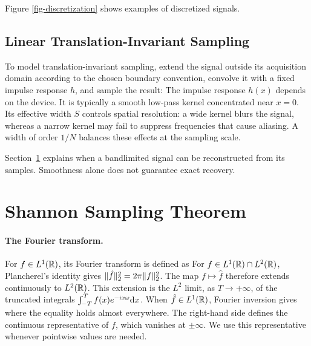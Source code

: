 Figure \ref{fig-discretization} shows examples of discretized signals.

\subsection{Linear Translation-Invariant Sampling}

To model translation-invariant sampling, extend the signal outside its acquisition domain according to the chosen boundary convention, convolve it with a fixed impulse response $h$, and sample the result:
The impulse response $h(x)$ depends on the device. It is typically a smooth low-pass kernel concentrated near $x=0$. Its effective width $S$ controls spatial resolution: a wide kernel blurs the signal, whereas a narrow kernel may fail to suppress frequencies that cause aliasing. A width of order $1/N$ balances these effects at the sampling scale.

Section~\ref{subsec-sampling} explains when a bandlimited signal can be reconstructed from its samples. Smoothness alone does not guarantee exact recovery.


\section{Shannon Sampling Theorem}
\label{subsec-sampling}

\paragraph{The Fourier transform.}

For $f \in L^1(\mathbb{R})$, its Fourier transform is defined as
For $f\in L^1(\mathbb{R})\cap L^2(\mathbb{R})$, Plancherel's identity gives $\lVert\hat f\rVert_2^2 = 2\pi\lVert f\rVert_2^2$. The map $f \mapsto \hat f$ therefore extends continuously to $L^2(\mathbb{R})$. This extension is the $L^2$ limit, as $T \rightarrow +\infty$, of the truncated integrals $\int_{-T}^T f(x) e^{-\mathrm{i} x \omega} \mathrm{d} x$.
%
When $\hat f \in L^1(\mathbb{R})$, Fourier inversion gives
where the equality holds almost everywhere. The right-hand side defines the continuous representative of $f$, which vanishes at $\pm\infty$. We use this representative whenever pointwise values are needed.

